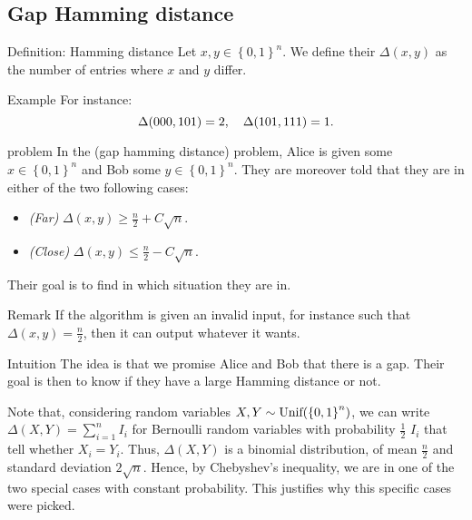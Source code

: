 \documentclass[a4paper]{article}
\begin{document}
\subsection{Gap Hamming distance}

\begin{parag}{Definition: Hamming distance}
    Let $x, y\in \left\{0, 1\right\}^n$. We define their  $\Delta\left(x, y\right)$ as the number of entries where $x$ and $y$ differ.

    \begin{subparag}{Example}
        For instance: 
        \[\Delta\left(000, 101\right) = 2, \mathspace \Delta\left(101, 111\right) = 1.\]
    \end{subparag}
\end{parag}


\begin{parag}{ problem}
    In the  (gap hamming distance) problem, Alice is given some $x \in \left\{0, 1\right\}^n$ and Bob some $y \in \left\{0, 1\right\}^n$. They are moreover told that they are in either of the two following cases:
    \begin{itemize}
        \item \textit{(Far)} $\Delta\left(x, y\right) \geq \frac{n}{2} + C \sqrt{n}$.
        \item \textit{(Close)} $\Delta\left(x, y\right) \leq \frac{n}{2} - C \sqrt{n}$.
    \end{itemize}

    Their goal is to find in which situation they are in. 

    \begin{subparag}{Remark}
        If the algorithm is given an invalid input, for instance such that $\Delta\left(x, y\right) = \frac{n}{2}$, then it can output whatever it wants.
    \end{subparag}
    
    \begin{subparag}{Intuition}
        The idea is that we promise Alice and Bob that there is a gap. Their goal is then to know if they have a large Hamming distance or not.

        Note that, considering random variables $X, Y \followsdistr \text{Unif}\left(\left\{0, 1\right\}^n\right)$, we can write $\Delta\left(X, Y\right) = \sum_{i=1}^{n} I_i$ for Bernoulli random variables with probability $\frac{1}{2}$ $I_i$ that tell whether $X_i = Y_i$. Thus, $\Delta\left(X, Y\right)$ is a binomial distribution, of mean $\frac{n}{2}$ and standard deviation $2\sqrt{n}$. Hence, by Chebyshev's inequality, we are in one of the two special cases with constant probability. This justifies why this specific cases were picked.
    \end{subparag}
\end{parag}
\end{document}
